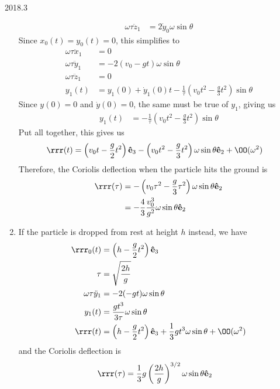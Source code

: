 \documentclass[12pt]{article}
\begin{document}
\begin{solution}{2018.3}
\begin{enumerate}
\begin{align*}
\omega \tau \ddot{z}_1 & = 2\dot{y}_0 \omega \sin \theta
\end{align*}
Since $x_0(t) = y_0(t) = 0$, this simplifies to
\begin{align*}
\omega \tau \ddot{x}_1 & = 0 \\
\omega \tau \ddot{y}_1 & = -2(v_0 - gt) \omega \sin \theta \\
\omega \tau \ddot{z}_1 & = 0 \\
y_1(t) & = y_1(0) + \dot{y}_1(0) t - \frac{1}{\tau} \left( v_0 t^2 - \frac{g}{3} t^2 \right) \sin \theta
\end{align*}
Since $y(0) = 0$ and $\dot{y}(0) = 0$, the same must be true of $y_1$, giving us
\begin{align*}
y_1(t) & = - \frac{1}{\tau} \left( v_0 t^2 - \frac{g}{3} t^2 \right) \sin \theta
\end{align*}
Put all together, this gives us
\begin{align*}
\rrr(t) & = \left( v_0 t - \frac{g}{2} t^2 \right) \ee_3
- \left( v_0 t^2 - \frac{g}{3} t^2 \right) \omega \sin \theta \ee_2 + \OO(\omega^2)
\end{align*}
Therefore, the Coriolis deflection when the particle hits the ground is
\begin{align*}
\rrr(\tau) & = - \left( v_0 \tau^2 - \frac{g}{3} \tau^2 \right) \omega \sin \theta \ee_2 \\
& = -\frac{4}{3} \frac{v_0^3}{g^2} \omega \sin \theta \ee_2
\end{align*}

\item
If the particle is dropped from rest at height $h$ instead, we have
\begin{align*}
\rrr_0(t) & = \left( h - \frac{g}{2} t^2 \right) \ee_3 \\
\tau & = \sqrt{\frac{2h}{g}} \\
\omega \tau \ddot{y}_1 & = -2 (-gt) \omega \sin \theta \\
y_1(t) & = \frac{gt^3}{3\tau} \omega \sin \theta \\
\rrr(t) & = \left( h - \frac{g}{2} t^2 \right) \ee_3 + \frac{1}{3} gt^3 \omega \sin \theta + \OO(\omega^2)
\end{align*}
and the Coriolis deflection is
\begin{align*}
\rrr(\tau) & = \frac{1}{3} g \left( \frac{2h}{g} \right)^{3/2} \omega \sin \theta \ee_2
\end{align*}





\end{enumerate}

\end{solution}
\end{document}
